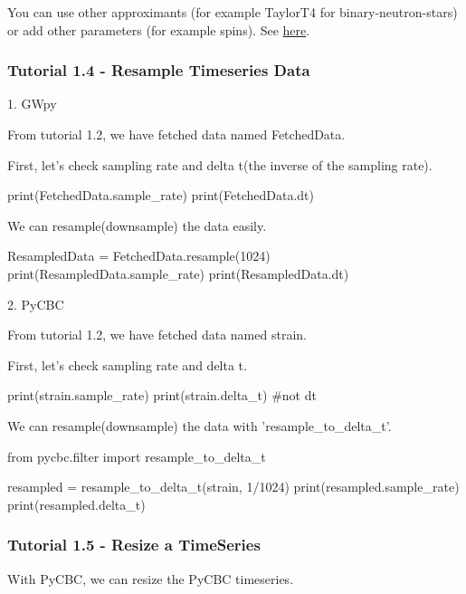 You can use other approximants (for example TaylorT4 for binary-neutron-stars) or add other parameters (for example spins). See \href{https://pycbc.org/pycbc/latest/html/pycbc.waveform.html#pycbc.waveform.waveform.get_td_waveform}{here}.

\subsubsection{Tutorial 1.4 - Resample Timeseries Data}

1. GWpy

From tutorial 1.2, we have fetched data named FetchedData.

First, let's check sampling rate and delta t(the inverse of the sampling rate).

\begin{python}[python3]
    print(FetchedData.sample_rate)
    print(FetchedData.dt)
\end{python}

We can resample(downsample) the data easily.

\begin{python}[python3]
    ResampledData = FetchedData.resample(1024)
    print(ResampledData.sample_rate)
    print(ResampledData.dt)
\end{python}

2. PyCBC

From tutorial 1.2, we have fetched data named strain.

First, let's check sampling rate and delta t.

\begin{python}[python3]
    print(strain.sample_rate)
    print(strain.delta_t) #not dt
\end{python}

We can resample(downsample) the data with 'resample\_to\_delta\_t'.

\begin{python}[python3]
    from pycbc.filter import resample_to_delta_t

    resampled = resample_to_delta_t(strain, 1/1024)
    print(resampled.sample_rate)
    print(resampled.delta_t)
\end{python}

\subsubsection{Tutorial 1.5 - Resize a TimeSeries}

With PyCBC, we can resize the PyCBC timeseries. 

